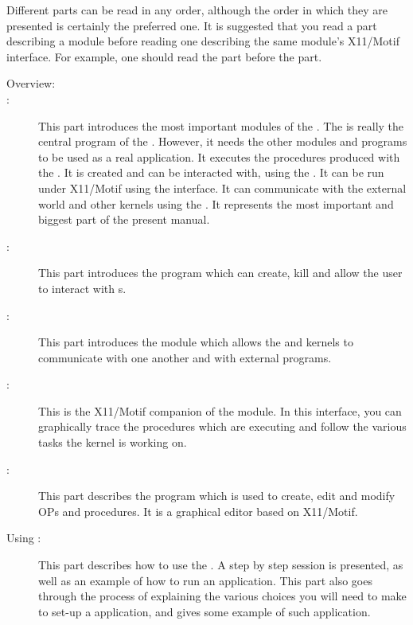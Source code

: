 Different parts can be read in any order, although the order in which they
are presented is certainly the preferred one. It is suggested that you read a part describing a 
module before reading one describing the
same module's X11/Motif interface. For example, one should read the
\CPK{} part before the \XPK{} part.

\begin{description}

\item[Overview:]

\item[\CPK{}:] This part introduces the most important modules of the
\COPRSDE{}.  The \CPK{} is really the central program of the \COPRSDE{}. However,
it needs the other modules and programs to be used as a real application. It
executes the procedures produced with the \OPE{}. It is created and can be
interacted with, using the \OPRSS{}. It can be run under X11/Motif using the
\XOPRS{} interface. It can communicate with the external world and other \COPRS{}
kernels using the \MP{}. It represents the most important and biggest part of
the present manual.

\item[\OPRSS{}:] This part introduces the \OPRSS{} program which can create, kill
and allow the user to interact with \CPK{}s.

\item[\MP{}:] This part introduces the module which allows the \COPRS{} and
\XOPRS{} kernels to communicate with one another and with external programs.

\item[\XPK{}:] This is the X11/Motif companion of the \CPK{} module. In this
interface, you can graphically trace the procedures which are executing and
follow the various tasks the kernel is working on.

\item[\OPE{}:] This part describes the program which is used to create, edit
and modify OPs and procedures. It is a graphical editor based on X11/Motif.

\item[Using \COPRS{}:] This part describes how to use the \COPRSDE{}. A step by
step \OPE{} session is presented, as well as an example of how to run an \XPK{}
application. This part also goes through the process of explaining the various
choices you will need to make to set-up a \COPRS{} application, and gives some
example of such application.



\end{description}
